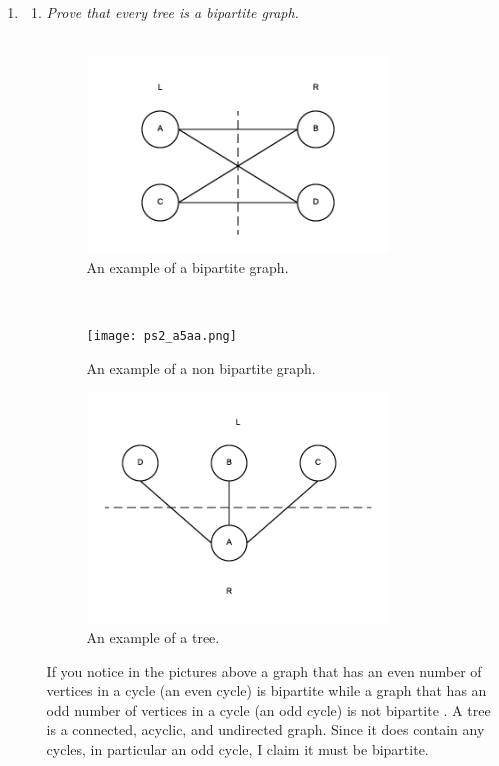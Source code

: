 \documentclass[12pt]{article}
\begin{document}
\begin{enumerate}
	\newpage
	\item
		\begin{enumerate}
			\item \textit{Prove that every tree is a bipartite graph.}\\
			\\
			\begin{figure}[h]
			\caption{An example of a bipartite graph.}
			\includegraphics[width=8cm]{ps2_q5a.png}
			\centering
			\end{figure}
			\\
			\begin{figure}[h]
			\caption{An example of a non bipartite graph.}
			\texttt{[image: ps2\_a5aa.png]}
			\centering
			\end{figure}			
			\begin{figure}[h]
			\caption{An example of a tree.}
			\includegraphics[width=8cm]{ps2_q5aaa.png}
			\centering
			\end{figure}
			\newpage
			If you notice in the pictures above a graph that has an even number of vertices in a cycle (an even cycle) is bipartite while a graph that has an odd number of vertices in a cycle (an odd cycle) is not bipartite \cite{1}.
			A tree is a connected, acyclic, and undirected graph.  Since it does contain any cycles, in particular an odd cycle, I claim it must be bipartite.\\
			\\

\end{enumerate}
\end{enumerate}
\end{document}
